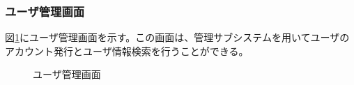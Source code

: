 \documentclass[a4j]{jarticle}
\begin{document}

\subsubsection{ユーザ管理画面}
図\ref{fig:user_admin_top}にユーザ管理画面を示す。この画面は、管理サブシステムを用いてユーザのアカウント発行とユーザ情報検索を行うことができる。
\begin{figure}[H]
\centering
{}
\caption{ユーザ管理画面}
\label{fig:user_admin_top}
\end{figure}
\end{document}
